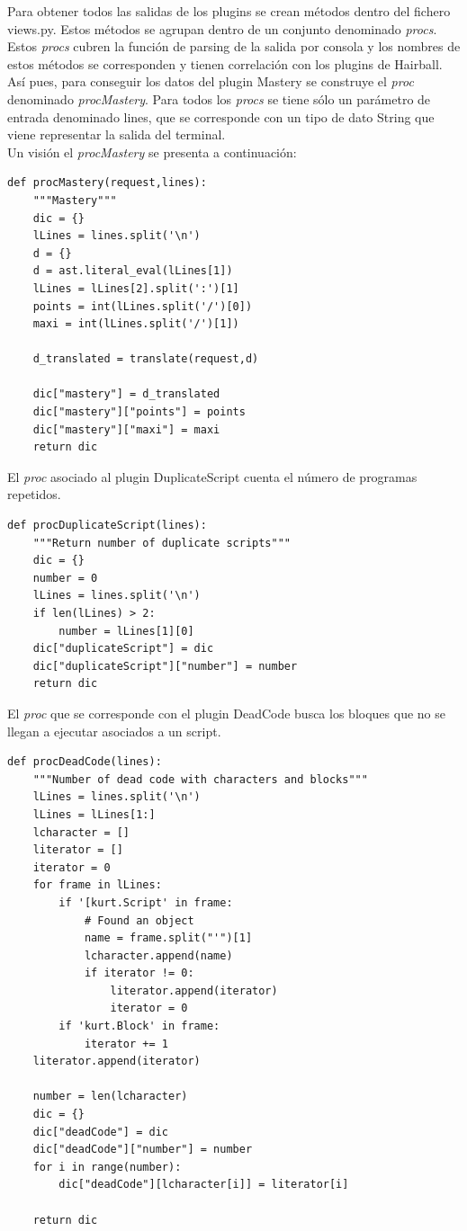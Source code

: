 \documentclass[a4paper, 12pt]{book}
\begin{document}
Para obtener todos las salidas de los plugins se crean métodos dentro del fichero views.py.
Estos métodos se agrupan dentro de un conjunto denominado \emph{procs}. Estos \emph{procs}
cubren la función de parsing de la salida por consola y los nombres de estos métodos se
corresponden y tienen correlación con los plugins de Hairball. Así pues, para conseguir 
los datos del plugin Mastery se construye el \emph{proc} denominado \emph{procMastery}. 
Para todos los \emph{procs} se tiene sólo un parámetro de entrada denominado lines, que se
corresponde con un tipo de dato String que viene representar la salida del terminal. \\

Un visión el \emph{procMastery} se presenta a continuación:
\begingroup
\fontsize{8pt}{9pt}\selectfont
\begin{verbatim}
def procMastery(request,lines):
    """Mastery"""
    dic = {}
    lLines = lines.split('\n')
    d = {}
    d = ast.literal_eval(lLines[1])
    lLines = lLines[2].split(':')[1]
    points = int(lLines.split('/')[0])
    maxi = int(lLines.split('/')[1])
    
    d_translated = translate(request,d)

    dic["mastery"] = d_translated
    dic["mastery"]["points"] = points
    dic["mastery"]["maxi"] = maxi
    return dic
\end{verbatim}
\endgroup

El \emph{proc} asociado al plugin DuplicateScript cuenta el número de programas
repetidos.
\begingroup
\fontsize{8pt}{9pt}\selectfont
\begin{verbatim}
def procDuplicateScript(lines):
    """Return number of duplicate scripts"""
    dic = {}
    number = 0
    lLines = lines.split('\n')
    if len(lLines) > 2:
        number = lLines[1][0]
    dic["duplicateScript"] = dic
    dic["duplicateScript"]["number"] = number
    return dic
\end{verbatim}
\endgroup

El \emph{proc} que se corresponde con el plugin DeadCode busca los bloques que no se
llegan a ejecutar asociados a un script.
\begingroup
\fontsize{8pt}{9pt}\selectfont
\begin{verbatim}
def procDeadCode(lines):
    """Number of dead code with characters and blocks"""
    lLines = lines.split('\n')
    lLines = lLines[1:]
    lcharacter = []
    literator = []
    iterator = 0
    for frame in lLines:
        if '[kurt.Script' in frame:
            # Found an object
            name = frame.split("'")[1]         
            lcharacter.append(name)
            if iterator != 0:
                literator.append(iterator)
                iterator = 0
        if 'kurt.Block' in frame:
            iterator += 1
    literator.append(iterator)

    number = len(lcharacter)
    dic = {}
    dic["deadCode"] = dic  
    dic["deadCode"]["number"] = number
    for i in range(number):
        dic["deadCode"][lcharacter[i]] = literator[i]
  
    return dic
\end{verbatim}
\endgroup
\end{document}
